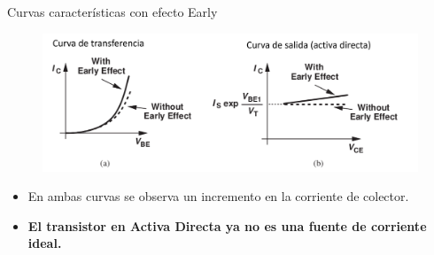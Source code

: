 \documentclass[t,aspectratio=169]{beamer}
\begin{document}
\begin{frame}{Curvas características con efecto Early}

\begin{figure}[H]
    \centering
    \includegraphics[width=\textwidth]{figuras/efecto_early_curvas.png}
\end{figure}

\begin{itemize}
    \item En ambas curvas se observa un incremento en la corriente de colector.
    \item \textbf{El transistor en Activa Directa ya no es una fuente de corriente ideal.}
\end{itemize}
    
\end{frame}
\end{document}
